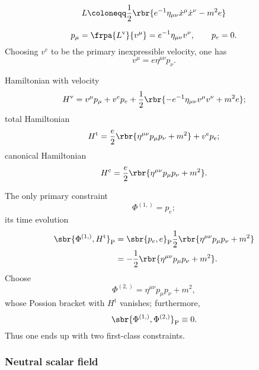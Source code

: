 \documentclass[a4paper,11pt]{article}
\begin{document}
\cite[sec.\ 2.1]{Blumenhagen2013}
\begin{equation}
L \coloneqq \frac{1}{2} \rbr{e^{-1}\eta_{\mu\nu}\dot{x}^\mu \dot{x}^\nu - m^2 e}
\label{eq:point-aux-lagrangian}
\end{equation}

\begin{equation}
p_\mu = \frpa{L^\text{v}}{v^\mu} = e^{-1}\eta_{\mu\nu}v^\nu, \qquad
p_e = 0.
\end{equation}
Choosing $v^e$ to be the primary inexpressible velocity, one has
\begin{equation}
v^\mu = e\eta^{\mu\nu}p_\nu.
\end{equation}

Hamiltonian with velocity
\begin{equation}
H^\text{v} = v^\mu p_\mu + v^e p_e + \frac{1}{2} \rbr{-e^{-1} \eta_{\mu\nu} 
v^\mu v^\nu + m^2 e};
\end{equation}
total Hamiltonian
\begin{equation}
H^\text{t} = \frac{e}{2} \rbr{\eta^{\mu\nu}p_\mu p_\nu + m^2} + v^e p_e;
\end{equation}
canonical Hamiltonian
\begin{equation}
H^\text{c} = \frac{e}{2} \rbr{\eta^{\mu\nu}p_\mu p_\nu + m^2}.
\end{equation}

The only primary constraint
\begin{equation}
\Phi^{(1,)} = p_e;
\end{equation}
its time evolution
\begin{align}
\sbr{\Phi^{(1,)}, H^\text{t}}_\text{P} &=
\sbr{p_e, e}_\text{P}\frac{1}{2}\rbr{\eta^{\mu\nu}p_\mu p_\nu + m^2}
\nonumber \\
&= -\frac{1}{2}\rbr{\eta^{\mu\nu}p_\mu p_\nu + m^2}.
\end{align}
Choose
\begin{equation}
\Phi^{(2,)} = \eta^{\mu\nu}p_\mu p_\nu + m^2,
\end{equation}
whose Possion bracket with $H^\text{t}$ vanishes; furthermore,
\begin{equation}
\sbr{\Phi^{(1,)},\Phi^{(2,)}}_\text{P} \equiv 0.
\end{equation}
Thus one ends up with two first-class constraints.



\subsubsection{Neutral scalar field}
\cite[sec.\ 3.3]{Kiefer2012}
\end{document}
